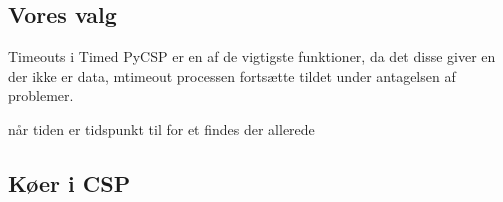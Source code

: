 \subsection{Vores valg}

Timeouts i Timed PyCSP er en af de vigtigste funktioner, da det disse
giver en der ikke er data, mtimeout processen fortsætte tildet under
antagelsen af problemer.

når tiden er tidspunkt til for et findes der allerede 



\subsection{Køer i CSP}



